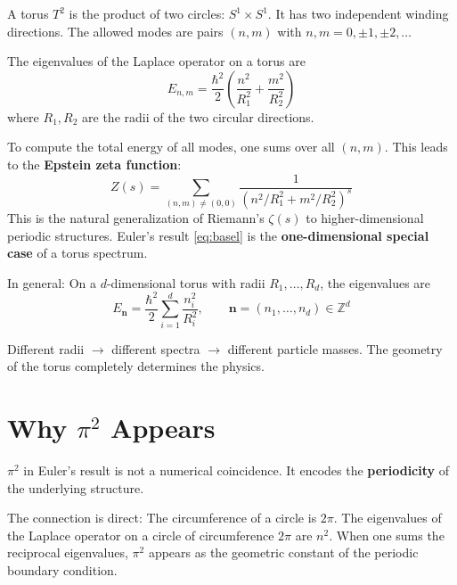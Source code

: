 	A torus $T^2$ is the product of two circles: $S^1 \times S^1$. It has two independent winding directions. The allowed modes are pairs $(n,m)$ with $n, m = 0, \pm 1, \pm 2, \ldots$
	
	The eigenvalues of the Laplace operator on a torus are
	\begin{equation}
		E_{n,m} = \frac{\hbar^2}{2} \left( \frac{n^2}{R_1^2} + \frac{m^2}{R_2^2} \right)
		\label{eq:torus-eigenvalues}
	\end{equation}
	where $R_1, R_2$ are the radii of the two circular directions.
	
	To compute the total energy of all modes, one sums over all $(n,m)$. This leads to the \textbf{Epstein zeta function}:
	\begin{equation}
		Z(s) = \sum_{(n,m) \neq (0,0)} \frac{1}{\left( n^2/R_1^2 + m^2/R_2^2 \right)^s}
	\end{equation}
	This is the natural generalization of Riemann's $\zeta(s)$ to higher-dimensional periodic structures. Euler's result \eqref{eq:basel} is the \textbf{one-dimensional special case} of a torus spectrum.
	
	In general: On a $d$-dimensional torus with radii $R_1, \ldots, R_d$, the eigenvalues are
	\begin{equation}
		E_{\mathbf{n}} = \frac{\hbar^2}{2} \sum_{i=1}^{d} \frac{n_i^2}{R_i^2}, \qquad \mathbf{n} = (n_1, \ldots, n_d) \in \mathbb{Z}^d
		\label{eq:d-torus-eigenvalues}
	\end{equation}
	
	\begin{keypoint}
		Different radii $\rightarrow$ different spectra $\rightarrow$ different particle masses. The geometry of the torus completely determines the physics.
	\end{keypoint}


	\section{Why $\pi^2$ Appears}
	
	$\pi^2$ in Euler's result is not a numerical coincidence. It encodes the \textbf{periodicity} of the underlying structure.
	
	The connection is direct: The circumference of a circle is $2\pi$. The eigenvalues of the Laplace operator on a circle of circumference $2\pi$ are $n^2$. When one sums the reciprocal eigenvalues, $\pi^2$ appears as the geometric constant of the periodic boundary condition.
	
